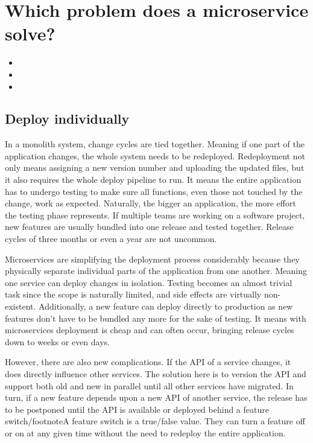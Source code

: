 \section{Which problem does a microservice solve?}
\label{sec:theory:what-problem}

\begin{itemize}
  \item {}
  \item {}
  \item {}
\end{itemize}

\subsection{Deploy individually}

In a monolith system, change cycles are tied together. Meaning if one part of the application changes, the whole system needs to be redeployed. Redeployment not only means assigning a new version number and uploading the updated files, but it also requires the whole deploy pipeline to run. It means the entire application has to undergo testing to make sure all functions, even those not touched by the change, work as expected. Naturally, the bigger an application, the more effort the testing phase represents. If multiple teams are working on a software project, new features are usually bundled into one release and tested together. Release cycles of three months or even a year are not uncommon.

Microservices are simplifying the deployment process considerably because they physically separate individual parts of the application from one another. Meaning one service can deploy changes in isolation. Testing becomes an almost trivial task since the scope is naturally limited, and side effects are virtually non-existent. Additionally, a new feature can deploy directly to production as new features don't have to be bundled any more for the sake of testing. It means with microservices deployment is cheap and can often occur, bringing release cycles down to weeks or even days.

However, there are also new complications. If the API of a service changes, it does directly influence other services. The solution here is to version the API and support both old and new in parallel until all other services have migrated. In turn, if a new feature depends upon a new API of another service, the release has to be postponed until the API is available or deployed behind a feature switch/footnote{A feature switch is a true/false value. They can turn a feature off or on at any given time without the need to redeploy the entire application}.


